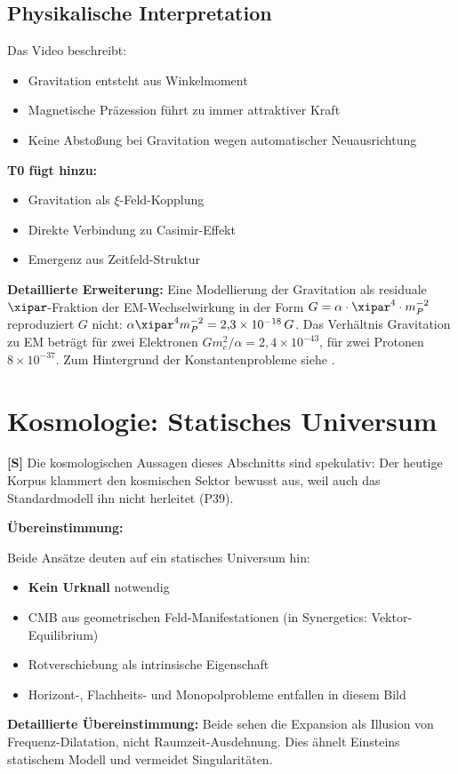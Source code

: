 	\subsection{Physikalische Interpretation}
	
	Das Video beschreibt:
	\begin{itemize}
		\item Gravitation entsteht aus Winkelmoment
		\item Magnetische Präzession führt zu immer attraktiver Kraft
		\item Keine Abstoßung bei Gravitation wegen automatischer Neuausrichtung
	\end{itemize}
	
	\textbf{T0 fügt hinzu:}
	\begin{itemize}
		\item Gravitation als $\xi$-Feld-Kopplung
		\item Direkte Verbindung zu Casimir-Effekt
		\item Emergenz aus Zeitfeld-Struktur
	\end{itemize}
	
	\textbf{Detaillierte Erweiterung:} Eine Modellierung der Gravitation als residuale $\xipar$-Fraktion der EM-Wechselwirkung in der Form $G = \alpha \cdot \xipar^4 \cdot m_P^{-2}$ reproduziert $G$ nicht: $\alpha\xipar^4 m_P^{-2} = 2{,}3\times10^{-18}\,G$. Das Verhältnis Gravitation zu EM beträgt für zwei Elektronen $G m_e^2/\alpha = 2{,}4\times10^{-43}$, für zwei Protonen $8\times10^{-37}$. Zum Hintergrund der Konstantenprobleme siehe \cite{weinberg_1989}.
	
	\section{Kosmologie: Statisches Universum}
	
	\textbf{[S]} Die kosmologischen Aussagen dieses Abschnitts sind spekulativ: Der heutige Korpus klammert den kosmischen Sektor bewusst aus, weil auch das Standardmodell ihn nicht herleitet (P39).
	
	\begin{gemeinsam}
		\textbf{Übereinstimmung:}
		
		Beide Ansätze deuten auf ein statisches Universum hin:
		\begin{itemize}
			\item \textbf{Kein Urknall} notwendig
			\item CMB aus geometrischen Feld-Manifestationen (in Synergetics: Vektor-Equilibrium)
			\item Rotverschiebung als intrinsische Eigenschaft
			\item Horizont-, Flachheits- und Monopolprobleme entfallen in diesem Bild
		\end{itemize}
		
		\textbf{Detaillierte Übereinstimmung:} Beide sehen die Expansion als Illusion von Frequenz-Dilatation, nicht Raumzeit-Ausdehnung. Dies ähnelt Einsteins statischem Modell \cite{einstein_1917} und vermeidet Singularitäten.
	\end{gemeinsam}
	

